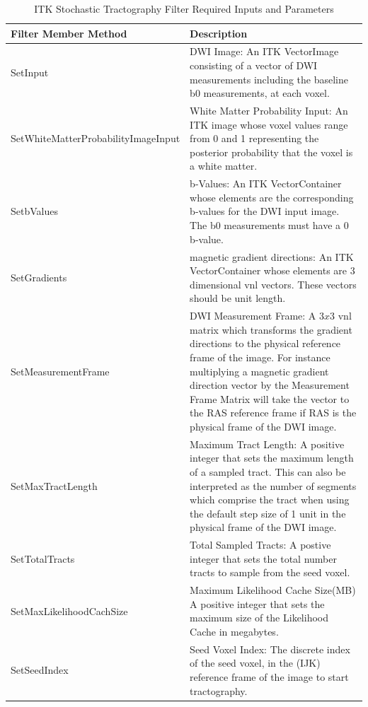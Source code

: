\begin{table} \label{tab:filterinputs}
  \center
  \begin{tabular}{| l | p{8cm} |}
    \hline 
    Filter Member Method & Description\\
    \hline
    \small{SetInput} & DWI Image: An ITK VectorImage consisting of a vector of DWI measurements including the baseline b0 measurements, at each voxel. \\
    \hline
    \small{SetWhiteMatterProbabilityImageInput} & White Matter Probability Input: An ITK image whose voxel values range from 0 and 1 representing the posterior probability that the voxel is a white matter.  \\
    \hline
    \small{SetbValues} &  b-Values: An ITK VectorContainer whose elements are the corresponding b-values for the DWI input image.  The b0 measurements must have a 0 b-value. \\
    \hline
    \small{SetGradients} & magnetic gradient directions: An ITK VectorContainer whose elements are 3 dimensional vnl vectors.  These vectors should be unit length.\\
    \hline
    \small{SetMeasurementFrame} & DWI Measurement Frame: A $3x3$ vnl matrix which transforms the gradient directions to the physical reference frame of the image.  For instance multiplying a magnetic gradient direction vector by the Measurement Frame Matrix will take the vector to the RAS reference frame if RAS is the physical frame of the DWI image. \\
    \hline
    \small{SetMaxTractLength} & Maximum Tract Length: A positive integer that sets the maximum length of a sampled tract.  This can also be interpreted as the number of segments which comprise the tract when using the default step size of 1 unit in the physical frame of the DWI image. \\
    \hline
    \small{SetTotalTracts} & Total Sampled Tracts: A postive integer that sets the total number tracts to sample from the seed voxel. \\
    \hline
    \small{SetMaxLikelihoodCachSize} & Maximum Likelihood Cache Size(MB) A positive integer that sets the maximum size of the Likelihood Cache in megabytes.\\
    \hline
    \small{SetSeedIndex} & Seed Voxel Index:  The discrete index of the seed voxel, in the (IJK) reference frame of the image to start tractography.
  \end{tabular}
  \caption{ITK Stochastic Tractography Filter Required Inputs and Parameters}
\end{table}

